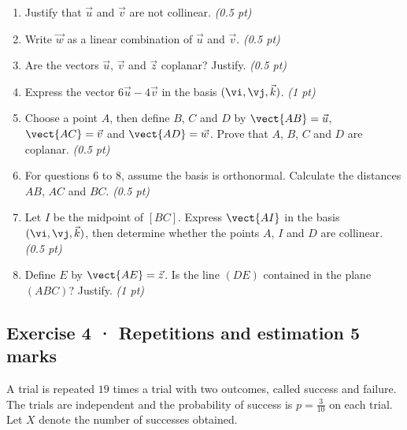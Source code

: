 \begin{enumerate}

\item Justify that $\vec u$ and $\vec v$ are not collinear. \hfill\textit{(0.5 pt)}

\item Write $\vec w$ as a linear combination of $\vec u$ and $\vec v$. \hfill\textit{(0.5 pt)}

\item Are the vectors $\vec u$, $\vec v$ and $\vec z$ coplanar? Justify. \hfill\textit{(0.5 pt)}

\item Express the vector $6\vec u-4\vec v$ in the basis $(\vi,\vj,\vec k)$. \hfill\textit{(1 pt)}

\item Choose a point $A$, then define $B$, $C$ and $D$ by $\vect{AB}=\vec u$, $\vect{AC}=\vec v$ and $\vect{AD}=\vec w$. Prove that $A$, $B$, $C$ and $D$ are coplanar. \hfill\textit{(0.5 pt)}

\item For questions 6 to 8, assume the basis is orthonormal. Calculate the distances $AB$, $AC$ and $BC$. \hfill\textit{(0.5 pt)}

\item Let $I$ be the midpoint of $[BC]$. Express $\vect{AI}$ in the basis $(\vi,\vj,\vec k)$, then determine whether the points $A$, $I$ and $D$ are collinear. \hfill\textit{(0.5 pt)}

\item Define $E$ by $\vect{AE}=\vec z$. Is the line $(DE)$ contained in the plane $(ABC)$? Justify. \hfill\textit{(1 pt)}

\end{enumerate}

\subsection*{Exercise 4 · Repetitions and estimation \hfill 5 marks}A trial is repeated $19$ times a trial with two outcomes, called success and failure. The trials are independent and the probability of success is $p=\frac{3}{10}$ on each trial. Let $X$ denote the number of successes obtained.

